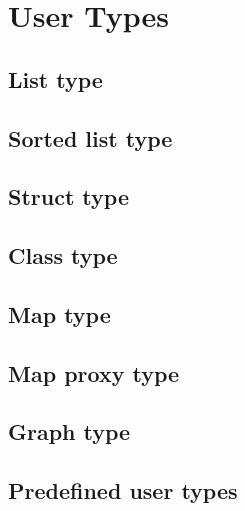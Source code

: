 
\chapter{User Types} \label{userTypes}


\section{List type}


\section{Sorted list type}


\section{Struct type}



\section{Class type}


\section{Map type}


\section{Map proxy type}




\section{Graph type}


\section{Predefined user types}

